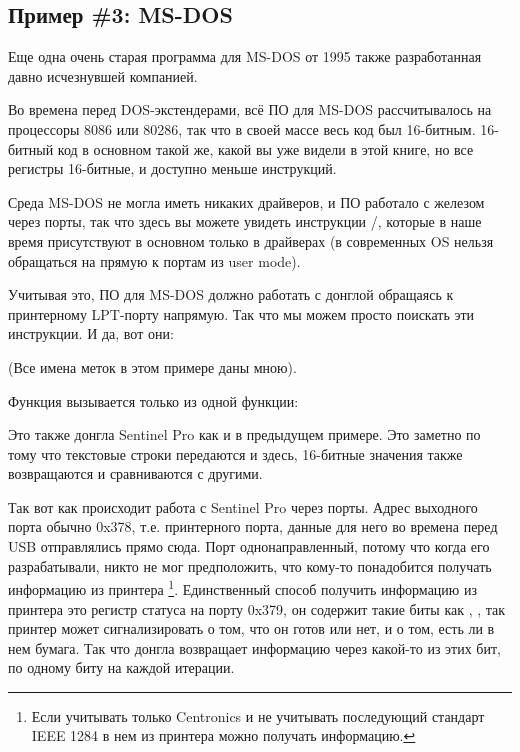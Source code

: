 \subsection{Пример \#3: MS-DOS}
\label{dongle_16bit_dos}

Еще одна очень старая программа для MS-DOS от 1995 
также разработанная давно исчезнувшей компанией.

Во времена перед DOS-экстендерами, всё ПО для MS-DOS рассчитывалось на процессоры 8086 или 80286,
так что в своей массе весь код был 16-битным.
16-битный код в основном такой же, какой вы уже видели в этой книге, но все регистры 16-битные,
и доступно меньше инструкций.

\label{IN_example}
\label{OUT_example}
Среда MS-DOS не могла иметь никаких драйверов, и ПО работало с  железом через порты,
так что здесь вы можете увидеть инструкции /, 
которые в наше время присутствуют в основном только
в драйверах (в современных OS нельзя обращаться на прямую к портам из \gls{user mode}).

Учитывая это, ПО для MS-DOS должно работать с донглой обращаясь к принтерному LPT-порту
напрямую.
Так что мы можем просто поискать эти инструкции. И да, вот они:



(Все имена меток в этом примере даны мною).

Функция  вызывается только из одной функции:



Это также  донгла Sentinel Pro как и в предыдущем примере.
Это заметно по тому что текстовые строки передаются и здесь, 16-битные значения также возвращаются и сравниваются с другими.

Так вот как происходит работа с Sentinel Pro через порты.
Адрес выходного порта обычно 0x378, т.е. принтерного порта, данные для него во времена
перед USB отправлялись прямо сюда.
Порт однонаправленный, потому что когда его разрабатывали, никто не мог предположить,
что кому-то понадобится получать информацию из принтера
\footnote{Если учитывать только Centronics и не учитывать последующий стандарт IEEE 1284\EMDASH{}
в нем из принтера можно получать информацию.}.
Единственный способ получить информацию из принтера это регистр статуса на порту 0x379,
он содержит такие биты как , , \EMDASH{}так принтер может сигнализировать
о том, что он готов или нет, и о том, есть ли в нем бумага.
Так что донгла возвращает информацию через какой-то из этих бит, по одному биту на каждой
итерации.

